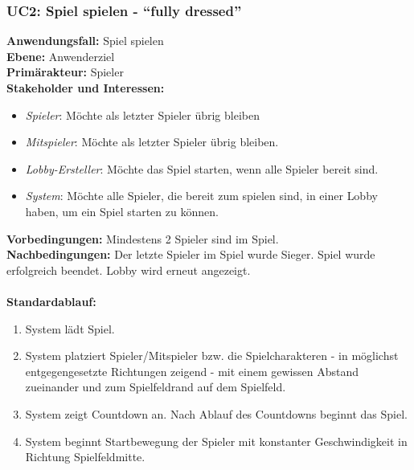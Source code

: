 \documentclass[11pt,ngerman]{article}
\newcommand{\quotes}[1]{``#1''}
\begin{document}
    \subsubsection{UC2: Spiel spielen - \quotes{fully dressed}}
    \label{ssec:UC2Spielspielen}
    \begin{tcolorbox}[enhanced, breakable, sharp corners, width=\dimexpr\textwidth-15mm\relax ,enlarge left by=10mm ,fontupper=\linespread{1.1}\selectfont, boxrule=1pt, title={UC2: Spiel spielen}, colback=white, colframe=gray!22, coltitle=black]

    	\textbf{Anwendungsfall:} Spiel spielen \\
    	\textbf{Ebene:} Anwenderziel \\
    	\textbf{Primärakteur:} Spieler \\
    	\textbf{Stakeholder und Interessen:}
    	\begin{itemize}
    		\item \textit{Spieler}: Möchte als letzter Spieler übrig bleiben
    		\item \textit{Mitspieler}: Möchte als letzter Spieler übrig bleiben.
    		\item \textit{Lobby-Ersteller}:  Möchte das Spiel starten, wenn alle Spieler bereit sind.
    		\item \textit{System}: Möchte alle Spieler, die bereit zum spielen sind, in einer \Gls{Lobby} haben, um ein Spiel starten zu können.
    	\end{itemize}
    	\textbf{Vorbedingungen:} Mindestens 2 Spieler sind im Spiel.\\
    	\textbf{Nachbedingungen:} Der letzte Spieler im Spiel wurde Sieger. Spiel wurde erfolgreich beendet. \Gls{Lobby} wird erneut angezeigt. \\
    	\\  \textbf{Standardablauf:}
    	\begin{enumerate}
    		\item System lädt Spiel.
    		\item System platziert Spieler/Mitspieler bzw. die Spielcharakteren - in möglichst entgegengesetzte Richtungen zeigend - mit einem gewissen Abstand zueinander und zum Spielfeldrand auf dem Spielfeld.
    		\item System zeigt Countdown an. Nach Ablauf des Countdowns beginnt das Spiel.
    		\item System beginnt Startbewegung der Spieler mit konstanter Geschwindigkeit in Richtung Spielfeldmitte.
    	\end{enumerate}

\end{tcolorbox}
\end{document}
